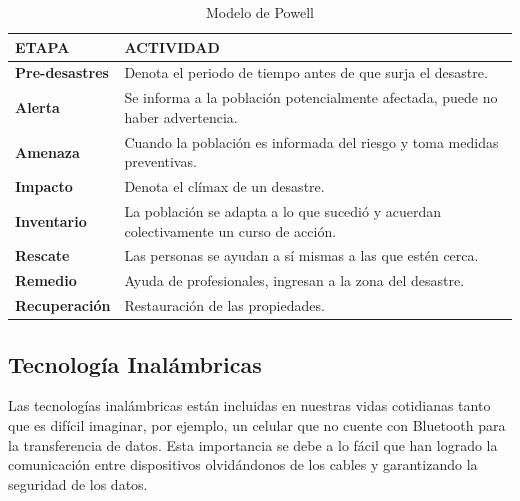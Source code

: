 \documentclass[11pt,openany]{book}
\newcounter{ns}
\begin{document}
	\begin{table}[htbp]
			\begin{tabular}{|l|p{9cm}|}\hline
				\textbf{ETAPA} &  \textbf{ACTIVIDAD} \\ \hline
				\textbf{Pre-desastres} & Denota el periodo de tiempo antes de que surja el desastre.\\ \hline 

				\textbf{Alerta}  & Se informa a la población potencialmente afectada, puede no haber advertencia.\\ \hline

				\textbf{Amenaza} & Cuando la población es informada del riesgo y toma medidas preventivas.\\ \hline 

				\textbf{Impacto} &Denota el clímax de un desastre. \\ \hline

				\textbf{Inventario} &La población se adapta a lo que sucedió y acuerdan colectivamente un curso de acción. \\ \hline

				\textbf{Rescate} &Las personas se ayudan a sí mismas a las que estén cerca. \\ \hline

				\textbf{Remedio} &Ayuda de profesionales, ingresan a la zona del desastre. \\ \hline

				\textbf{Recuperación} &Restauración de las propiedades. \\ \hline

			\end{tabular}
				\caption{Modelo de Powell}
		\end{table}

	\subsection{Tecnología Inalámbricas}
	Las tecnologías inalámbricas están incluidas en nuestras vidas cotidianas tanto que es difícil imaginar, por ejemplo, un celular que no cuente con Bluetooth para la transferencia de datos. Esta importancia se debe a lo fácil que han logrado la comunicación entre dispositivos olvidándonos de los cables y garantizando la seguridad de los datos.
\end{document}
